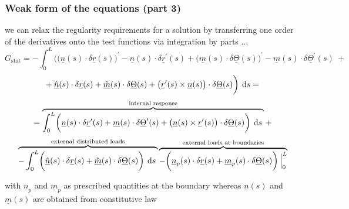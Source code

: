 \begin{frame}
  \frametitle{Weak form of the equations (part 3)}
  
  we can relax the regularity requirements for a solution by transferring one order of the derivatives onto the test functions via integration by parts ...
  \begin{displaymath}
    G_{\text{stat}} =
    - \int_0^L \biggl( 
        \bigl( \underline{n}(s) \cdot \delta \underline{r}(s) \bigr)^{\prime}
      - \underline{n}(s) \cdot \delta \underline{r}^{\prime}(s)
      + \bigl( \underline{m}(s) \cdot \delta \underline{\Theta}(s) \bigr)^{\prime}
      - \underline{m}(s) \cdot \delta \underline{\Theta}^{\prime}(s) \: +
  \end{displaymath}
  \begin{displaymath}
      + \: \underline{\hat{n}}(s) \cdot \delta \underline{r}(s)
      + \underline{\hat{m}}(s) \cdot \delta \underline{\Theta}(s)
      + \bigl( \underline{r}^{\prime}(s) \times \underline{n}(s) \bigr) \cdot \delta \underline{\Theta}(s)    
    \biggr) \: \dif s =
  \end{displaymath}
  \begin{displaymath}
    = 
    \overbrace{
      \int_0^L \biggl( 
        \underline{n}(s) \cdot \delta \underline{r}^{\prime}(s)
      + \underline{m}(s) \cdot \delta \underline{\Theta}^{\prime}(s)
      + \bigl( \underline{n}(s) \times \underline{r}^{\prime}(s) \bigr) \cdot \delta \underline{\Theta}(s)
      \biggr) \: \dif s \: 
    }^{\text{internal response}} + 
  \end{displaymath}
  \begin{displaymath}
    \overbrace{
    - \int_0^L \biggl( 
        \underline{\hat{n}}(s) \cdot \delta \underline{r}(s)
      + \underline{\hat{m}}(s) \cdot \delta \underline{\Theta}(s)
     \biggr) \: \dif s \:
    }^{\text{external distributed loads}}
    \overbrace{
    - \biggl(
      \underline{n}_p(s) \cdot \delta \underline{r}(s) +
      \underline{m}_p(s) \cdot \delta \underline{\Theta}(s)
    \biggr) \sVert[2]_0^L
    }^{\text{external loads at boundaries}}
  \end{displaymath}
  
  \vspace{0.5em}
  with $\underline{n}_p$ and $\underline{m}_p$ as prescribed quantities at the boundary \newline
  whereas $\underline{n}(s)$ and $\underline{m}(s)$ are obtained from constitutive law
\end{frame}


